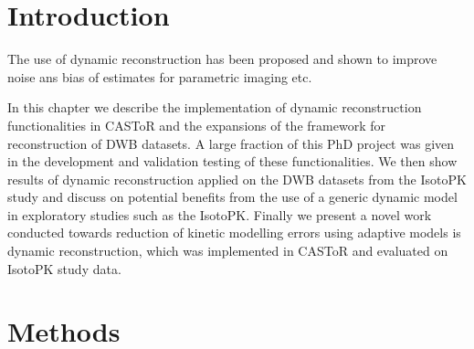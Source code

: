 \section{Introduction}
The use of dynamic reconstruction has been proposed and shown to improve noise ans bias of estimates for parametric imaging etc.

In this chapter we describe the implementation of dynamic reconstruction functionalities in CASToR and the expansions of the framework for reconstruction of DWB datasets. A large fraction of this PhD project was given in the development and validation testing of these functionalities. 
We then show results of dynamic reconstruction applied on the DWB datasets from the IsotoPK study and discuss on potential benefits from the use of a generic dynamic model in exploratory studies such as the IsotoPK. 
Finally we present a novel work conducted towards reduction of kinetic modelling errors using adaptive models is dynamic reconstruction, which was implemented in CASToR and evaluated on IsotoPK study data. 

\section{Methods}

